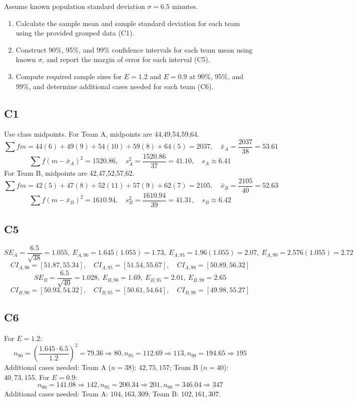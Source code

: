 \begin{ExamProblems}
		Assume known population standard deviation $\sigma=6.5$ minutes.
		\begin{enumerate}
			\item Calculate the sample mean and sample standard deviation for each team using the provided grouped data (C1).
			\item Construct 90\%, 95\%, and 99\% confidence intervals for each team mean using known $\sigma$, and report the margin of error for each interval (C5).
			\item Compute required sample sizes for $E=1.2$ and $E=0.9$ at 90\%, 95\%, and 99\%, and determine additional cases needed for each team (C6).
		\end{enumerate}
		
		\subsection*{C1}
		Use class midpoints.
		For Team A, midpoints are 44,49,54,59,64.
		\[
		\sum fm=44(6)+49(9)+54(10)+59(8)+64(5)=2037,
		\quad \bar{x}_A=\frac{2037}{38}=53.61
		\]
		\[
		\sum f(m-\bar{x}_A)^2=1520.86,
		\quad s_A^2=\frac{1520.86}{37}=41.10,
		\quad s_A\approx6.41
		\]
		For Team B, midpoints are 42,47,52,57,62.
		\[
		\sum fm=42(5)+47(8)+52(11)+57(9)+62(7)=2105,
		\quad \bar{x}_B=\frac{2105}{40}=52.63
		\]
		\[
		\sum f(m-\bar{x}_B)^2=1610.94,
		\quad s_B^2=\frac{1610.94}{39}=41.31,
		\quad s_B\approx6.42
		\]
		
		\subsection*{C5}
		\[
		SE_A=\frac{6.5}{\sqrt{38}}=1.055,
		\ E_{A,90}=1.645(1.055)=1.73,
		\ E_{A,95}=1.96(1.055)=2.07,
		\ E_{A,99}=2.576(1.055)=2.72
		\]
		\[
		CI_{A,90}=[51.87,55.34],\quad CI_{A,95}=[51.54,55.67],\quad CI_{A,99}=[50.89,56.32]
		\]
		\[
		SE_B=\frac{6.5}{\sqrt{40}}=1.028,
		\ E_{B,90}=1.69,
		\ E_{B,95}=2.01,
		\ E_{B,99}=2.65
		\]
		\[
		CI_{B,90}=[50.93,54.32],\quad CI_{B,95}=[50.61,54.64],\quad CI_{B,99}=[49.98,55.27]
		\]
		
		\subsection*{C6}
		For $E=1.2$:
		\[
		n_{90}=\left(\frac{1.645\cdot6.5}{1.2}\right)^2=79.36\Rightarrow80,
		n_{95}=112.69\Rightarrow113,
		n_{99}=194.65\Rightarrow195
		\]
		Additional cases needed:
		Team A ($n=38$): $42,75,157$; Team B ($n=40$): $40,73,155$.
		For $E=0.9$:
		\[
		n_{90}=141.08\Rightarrow142,
		n_{95}=200.34\Rightarrow201,
		n_{99}=346.04\Rightarrow347
		\]
		Additional cases needed:
		Team A: $104,163,309$; Team B: $102,161,307$.
		

\end{ExamProblems}
